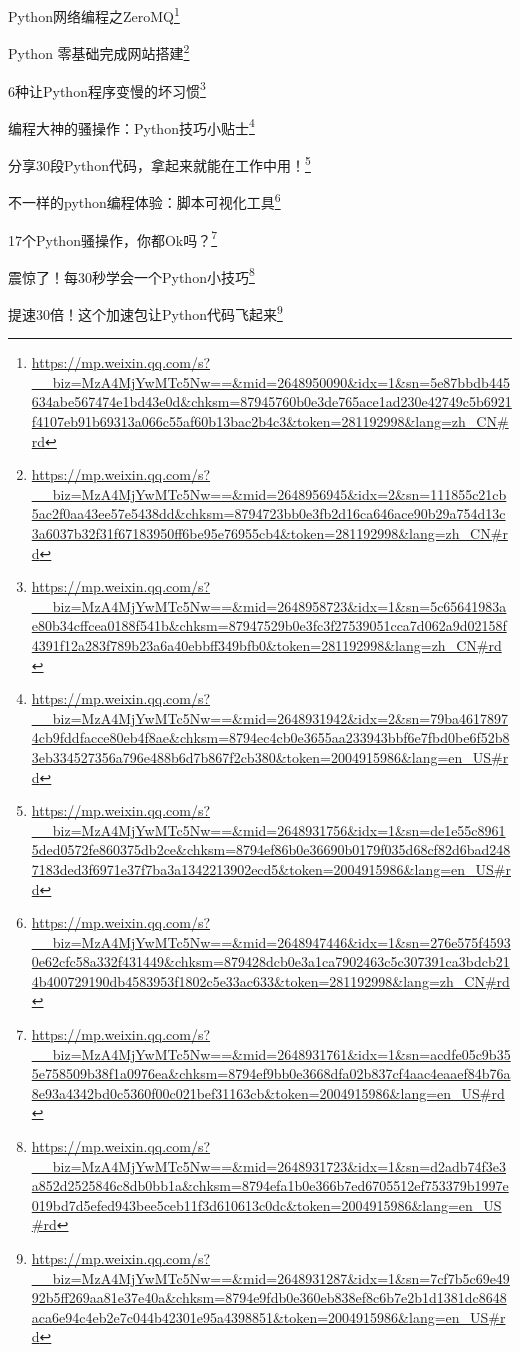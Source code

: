 \documentclass[]{ctexbook}
\renewcommand{\href}[2]{#2\footnote{\url{#1}}}
\begin{document}
\href{https://mp.weixin.qq.com/s?__biz=MzA4MjYwMTc5Nw==\&mid=2648950090\&idx=1\&sn=5e87bbdb445634abe567474e1bd43e0d\&chksm=87945760b0e3de765ace1ad230e42749c5b6921f4107eb91b69313a066c55af60b13bac2b4c3\&token=281192998\&lang=zh_CN\#rd}{Python网络编程之ZeroMQ}

\href{https://mp.weixin.qq.com/s?__biz=MzA4MjYwMTc5Nw==\&mid=2648956945\&idx=2\&sn=111855c21cb5ac2f0aa43ee57e5438dd\&chksm=8794723bb0e3fb2d16ca646ace90b29a754d13c3a6037b32f31f67183950ff6be95e76955cb4\&token=281192998\&lang=zh_CN\#rd}{Python 零基础完成网站搭建}

\href{https://mp.weixin.qq.com/s?__biz=MzA4MjYwMTc5Nw==\&mid=2648958723\&idx=1\&sn=5c65641983ae80b34cffcea0188f541b\&chksm=87947529b0e3fc3f27539051cca7d062a9d02158f4391f12a283f789b23a6a40ebbff349bfb0\&token=281192998\&lang=zh_CN\#rd}{6种让Python程序变慢的坏习惯}

\href{https://mp.weixin.qq.com/s?__biz=MzA4MjYwMTc5Nw==\&mid=2648931942\&idx=2\&sn=79ba46178974cb9fddfacce80eb4f8ae\&chksm=8794ec4cb0e3655aa233943bbf6e7fbd0be6f52b83eb334527356a796e488b6d7b867f2cb380\&token=2004915986\&lang=en_US\#rd}{编程大神的骚操作：Python技巧小贴士}

\href{https://mp.weixin.qq.com/s?__biz=MzA4MjYwMTc5Nw==\&mid=2648931756\&idx=1\&sn=de1e55c89615ded0572fe860375db2ce\&chksm=8794ef86b0e36690b0179f035d68cf82d6bad2487183ded3f6971e37f7ba3a1342213902ecd5\&token=2004915986\&lang=en_US\#rd}{分享30段Python代码，拿起来就能在工作中用！}

\href{https://mp.weixin.qq.com/s?__biz=MzA4MjYwMTc5Nw==\&mid=2648947446\&idx=1\&sn=276e575f45930e62cfc58a332f431449\&chksm=879428dcb0e3a1ca7902463c5c307391ca3bdcb214b400729190db4583953f1802c5e33ac633\&token=281192998\&lang=zh_CN\#rd}{不一样的python编程体验：脚本可视化工具}

\href{https://mp.weixin.qq.com/s?__biz=MzA4MjYwMTc5Nw==\&mid=2648931761\&idx=1\&sn=acdfe05c9b355e758509b38f1a0976ea\&chksm=8794ef9bb0e3668dfa02b837cf4aac4eaaef84b76a8e93a4342bd0c5360f00c021bef31163cb\&token=2004915986\&lang=en_US\#rd}{17个Python骚操作，你都Ok吗？}

\href{https://mp.weixin.qq.com/s?__biz=MzA4MjYwMTc5Nw==\&mid=2648931723\&idx=1\&sn=d2adb74f3e3a852d2525846c8db0bb1a\&chksm=8794efa1b0e366b7ed6705512ef753379b1997e019bd7d5efed943bee5ceb11f3d610613c0dc\&token=2004915986\&lang=en_US\#rd}{震惊了！每30秒学会一个Python小技巧}

\href{https://mp.weixin.qq.com/s?__biz=MzA4MjYwMTc5Nw==\&mid=2648931287\&idx=1\&sn=7cf7b5c69e4992b5ff269aa81e37e40a\&chksm=8794e9fdb0e360eb838ef8c6b7e2b1d1381dc8648aca6e94c4eb2e7c044b42301e95a4398851\&token=2004915986\&lang=en_US\#rd}{提速30倍！这个加速包让Python代码飞起来}
\end{document}
